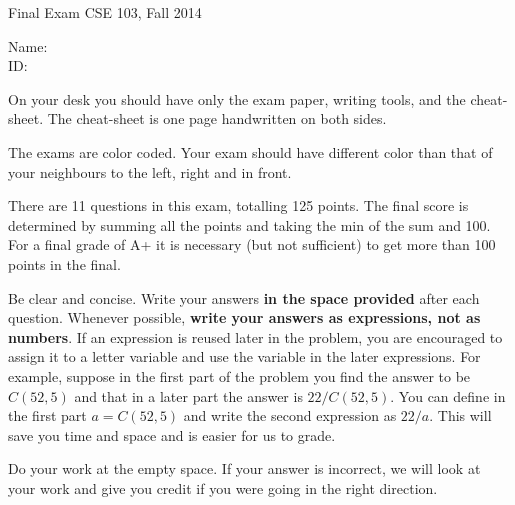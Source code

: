 {\textbf \Large Final Exam} \hfill CSE 103, Fall 2014
\\

\vspace{.25in}

Name: \underline{\hspace{3in}}
\\

ID: \underline{\hspace{3.2in}}
\\

\vspace{0.5in}

On your desk you should have only the exam paper, writing tools, and
the cheat-sheet. The cheat-sheet is one page handwritten on both sides.

The exams are color coded. Your exam should have different color 
than that of your neighbours to the left, right and in front.

There are 11 questions in this exam, totalling 125 points.  The final
score is determined by summing all the points and taking the min of
the sum and 100. For a final grade of A+ it is necessary (but not
sufficient) to get more than 100 points in the final. 

Be clear and concise. Write your answers {\bf in the space provided}
after each question. Whenever possible, {\bf write your answers
as expressions, not as numbers}. If an expression is reused
later in the problem, you are encouraged to assign it to a letter
variable and use the variable in the later expressions. For example,
suppose in the first part of the problem you find the answer to be
$C(52,5)$ and that in a later part the answer is $22/C(52,5)$. You can
define in the first part $a=C(52,5)$ and write the second expression
as $22/a$. This will save you time and space and is easier for us to
grade.

Do your work at the empty space. If your answer is incorrect, we will
look at your work and give you credit if you were going in the right direction.

\vspace{0.2in}

